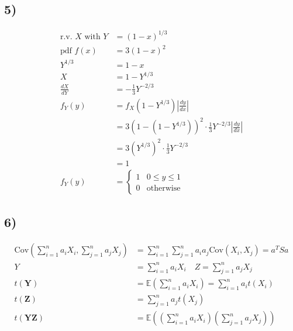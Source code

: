 \documentclass{article}
\begin{document}
\subsection*{5)}
\begin{align*}
\text{r.v. } X \text{ with } Y &= (1-x)^{1/3} \\
\text{pdf } f(x) &= 3(1-x)^2 \\
Y^{1/3} &= 1-x \\
X &= 1-Y^{1/3} \\
\frac{dX}{dY} &= -\frac{1}{3} Y^{-2/3} \\
f_Y(y) &= f_X(1-Y^{1/3}) \left| \frac{dy}{dx} \right| \\
&= 3(1-(1-Y^{1/3}))^2 \cdot \frac{1}{3} Y^{-2/3} \left| \frac{dy}{dx} \right| \\
&= 3(Y^{1/3})^2 \cdot \frac{1}{3} Y^{-2/3} \\
&= 1 \\
f_Y(y) &=
\begin{cases} 
1 & 0 \leq y \leq 1 \\
0 & \text{otherwise} 
\end{cases}
\end{align*}

\subsection*{6)}
\begin{align*}
\text{Cov} \left( \sum_{i=1}^{n} a_i X_i, \sum_{j=1}^{n} a_j X_j \right) &= \sum_{i=1}^{n} \sum_{j=1}^{n} a_i a_j \text{Cov}(X_i, X_j) = a^T S a \\
Y &= \sum_{i=1}^{n} a_i X_i \quad Z = \sum_{j=1}^{n} a_j X_j \\
t(\mathbf{Y}) &= \mathbb{E} \left( \sum_{i=1}^{n} a_i X_i \right) = \sum_{i=1}^{n} a_i t(X_i) \\
t(\mathbf{Z}) &= \sum_{j=1}^{n} a_j t(X_j) \\
t(\mathbf{Y Z}) &= \mathbb{E} \left( \left( \sum_{i=1}^{n} a_i X_i \right) \left( \sum_{j=1}^{n} a_j X_j \right) \right)
\end{align*}
\end{document}
